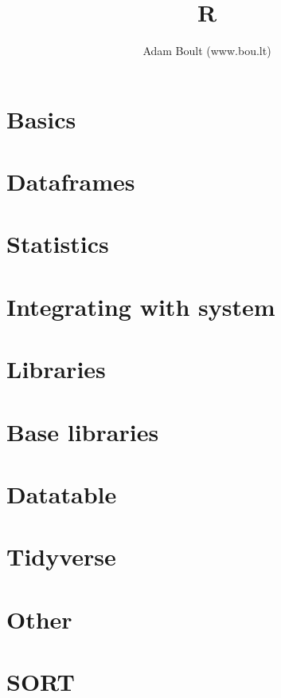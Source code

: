 \documentclass[oneside]{book}
\begin{document}
\author{Adam Boult (www.bou.lt)}
\title{R}
\maketitle

\setcounter{tocdepth}{0}
\tableofcontents



\part{Basics}







\part{Dataframes}


\part{Statistics}

\part{Integrating with system}



\part{Libraries}

\part{Base libraries}

\part{Datatable}


\part{Tidyverse}








\part{Other}




\part{SORT}

\end{document}
